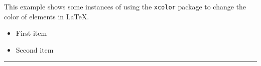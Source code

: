 \documentclass{article}
\begin{document}
This example shows some instances of using the \texttt{xcolor} package 
to change the color of elements in \LaTeX.

\begin{itemize}
\color{blue}
\item First item
\item Second item
\end{itemize}

\noindent
{\color{red} \rule{\linewidth}{0.1mm}}
\end{document}
